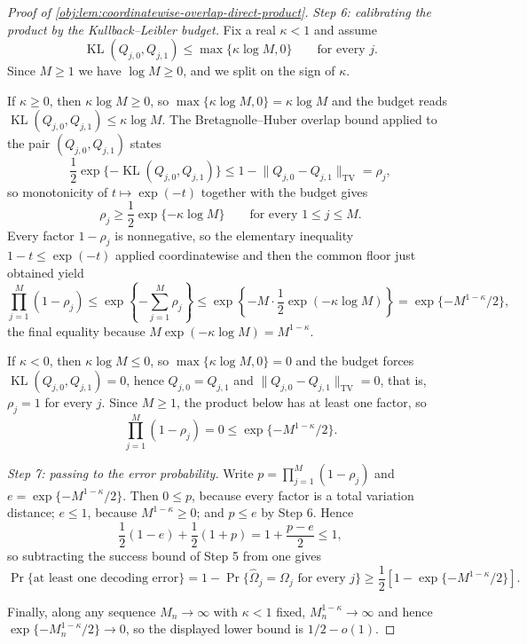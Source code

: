 \begin{proof}[Proof of \cref{obj:lem:coordinatewise-overlap-direct-product}]
\emph{Step 6: calibrating the product by the Kullback--Leibler budget.}
Fix a real \(\kappa<1\) and assume
\[
\operatorname{KL}(Q_{j,0},Q_{j,1})\leq\max\{\kappa\log M,0\}
\qquad\text{for every }j .
\]
Since \(M\geq1\) we have \(\log M\geq0\), and we split on the sign of \(\kappa\).

If \(\kappa\geq0\), then \(\kappa\log M\geq0\), so \(\max\{\kappa\log M,0\}=\kappa\log M\) and the budget reads \(\operatorname{KL}(Q_{j,0},Q_{j,1})\leq\kappa\log M\). The Bretagnolle--Huber overlap bound applied to the pair \((Q_{j,0},Q_{j,1})\) states
\[
\frac12\exp\{-\operatorname{KL}(Q_{j,0},Q_{j,1})\}
\leq
1-\lVert Q_{j,0}-Q_{j,1}\rVert_{\mathrm{TV}}
=\rho_j,
\]
so monotonicity of \(t\mapsto\exp(-t)\) together with the budget gives
\[
\rho_j\geq\frac12\exp\{-\kappa\log M\}
\qquad\text{for every }1\leq j\leq M .
\]
Every factor \(1-\rho_j\) is nonnegative, so the elementary inequality \(1-t\leq\exp(-t)\) applied coordinatewise and then the common floor just obtained yield
\[
\prod_{j=1}^M(1-\rho_j)
\leq
\exp\left\{-\sum_{j=1}^M\rho_j\right\}
\leq
\exp\left\{-M\cdot\frac12\exp(-\kappa\log M)\right\}
=
\exp\{-M^{1-\kappa}/2\},
\]
the final equality because \(M\exp(-\kappa\log M)=M^{1-\kappa}\).

If \(\kappa<0\), then \(\kappa\log M\leq0\), so \(\max\{\kappa\log M,0\}=0\) and the budget forces \(\operatorname{KL}(Q_{j,0},Q_{j,1})=0\), hence \(Q_{j,0}=Q_{j,1}\) and \(\lVert Q_{j,0}-Q_{j,1}\rVert_{\mathrm{TV}}=0\), that is, \(\rho_j=1\) for every \(j\). Since \(M\geq1\), the product below has at least one factor, so
\[
\prod_{j=1}^M(1-\rho_j)=0\leq\exp\{-M^{1-\kappa}/2\}.
\]

\emph{Step 7: passing to the error probability.}
Write \(p=\prod_{j=1}^M(1-\rho_j)\) and \(e=\exp\{-M^{1-\kappa}/2\}\). Then \(0\leq p\), because every factor is a total variation distance; \(e\leq1\), because \(M^{1-\kappa}\geq0\); and \(p\leq e\) by Step 6. Hence
\[
\frac12(1-e)+\frac12(1+p)=1+\frac{p-e}{2}\leq1,
\]
so subtracting the success bound of Step 5 from one gives
\[
\Pr\{\text{at least one decoding error}\}
=
1-\Pr\{\widehat\Omega_j=\Omega_j\text{ for every }j\}
\geq
\frac12\left[1-\exp\{-M^{1-\kappa}/2\}\right].
\]

Finally, along any sequence \(M_n\to\infty\) with \(\kappa<1\) fixed, \(M_n^{1-\kappa}\to\infty\) and hence \(\exp\{-M_n^{1-\kappa}/2\}\to0\), so the displayed lower bound is \(1/2-o(1)\).
\end{proof}
